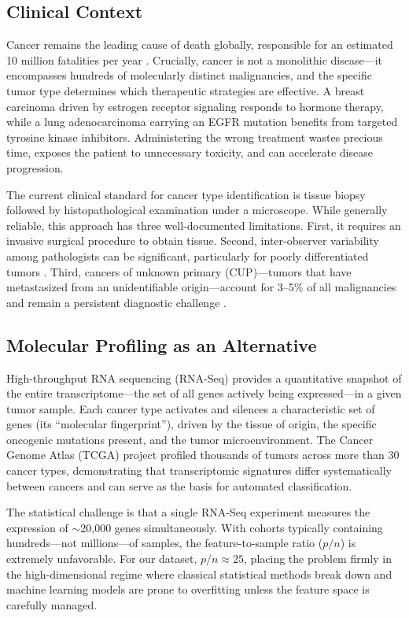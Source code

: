 \documentclass{article}
\begin{document}
\subsection{Clinical Context}
Cancer remains the leading cause of death globally, responsible for an estimated 10 million fatalities per year \citep{who2022cancer}. Crucially, cancer is not a monolithic disease---it encompasses hundreds of molecularly distinct malignancies, and the specific tumor type determines which therapeutic strategies are effective. A breast carcinoma driven by estrogen receptor signaling responds to hormone therapy, while a lung adenocarcinoma carrying an EGFR mutation benefits from targeted tyrosine kinase inhibitors. Administering the wrong treatment wastes precious time, exposes the patient to unnecessary toxicity, and can accelerate disease progression.

The current clinical standard for cancer type identification is tissue biopsy followed by histopathological examination under a microscope. While generally reliable, this approach has three well-documented limitations. First, it requires an invasive surgical procedure to obtain tissue. Second, inter-observer variability among pathologists can be significant, particularly for poorly differentiated tumors \citep{elmore2015diagnostic}. Third, cancers of unknown primary (CUP)---tumors that have metastasized from an unidentifiable origin---account for 3--5\% of all malignancies and remain a persistent diagnostic challenge \citep{varadhachary2014cancer}.

\subsection{Molecular Profiling as an Alternative}
High-throughput RNA sequencing (RNA-Seq) provides a quantitative snapshot of the entire transcriptome---the set of all genes actively being expressed---in a given tumor sample. Each cancer type activates and silences a characteristic set of genes (its ``molecular fingerprint''), driven by the tissue of origin, the specific oncogenic mutations present, and the tumor microenvironment. The Cancer Genome Atlas (TCGA) project \citep{weinstein2013cancer} profiled thousands of tumors across more than 30 cancer types, demonstrating that transcriptomic signatures differ systematically between cancers and can serve as the basis for automated classification.

The statistical challenge is that a single RNA-Seq experiment measures the expression of $\sim$20{,}000 genes simultaneously. With cohorts typically containing hundreds---not millions---of samples, the feature-to-sample ratio ($p/n$) is extremely unfavorable. For our dataset, $p/n \approx 25$, placing the problem firmly in the high-dimensional regime where classical statistical methods break down and machine learning models are prone to overfitting unless the feature space is carefully managed.
\end{document}

